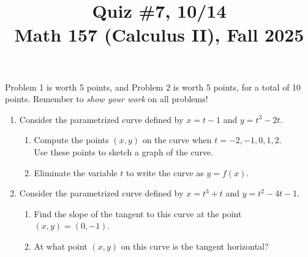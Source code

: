 \documentclass[11pt]{article}
\title{Quiz \#7, 10/14\\ Math 157 (Calculus II), Fall 2025}
\date{}
\begin{document}
\maketitle

\thispagestyle{empty}

\vspace{-2cm}

Problem 1 is worth 5 points, and Problem 2 is worth 5 points, for a total of 10 points. Remember to \emph{show your work} on all problems!

\begin{enumerate}
\item Consider the parametrized curve defined by $x = t-1$ and $y=t^3-2t$.
\begin{enumerate}
\item Compute the points $(x,y)$ on the curve when $t=-2, -1, 0, 1, 2$. \\ Use these points to sketch a graph of the curve.
\item Eliminate the variable $t$ to write the curve as $y=f(x)$.
\end{enumerate}

\vspace{3.15in}

\item Consider the parametrized curve defined by $x = t^3+t$ and $y=t^2-4t-1$.
\begin{enumerate}
\item Find the slope of the tangent to this curve at the point $(x,y) = (0,-1)$.
\item At what point $(x,y)$ on this curve is the tangent horizontal?
\end{enumerate}

\end{enumerate}
\end{document}
